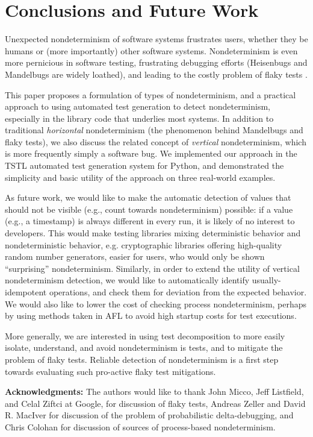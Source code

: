 \section{Conclusions and Future Work}

Unexpected nondeterminism of software systems frustrates users,
whether they be humans or (more importantly) other software systems.
Nondeterminism is even more pernicious in software testing,
frustrating debugging efforts (Heisenbugs \cite{Heisenbug} and
Mandelbugs \cite{GrottkeBugs,FaultTriggers} are widely loathed), and
leading to the costly problem of flaky tests
\cite{miccoflaky,listfieldtestanalysis}.

This paper proposes a formulation of types of nondeterminism, and a
practical approach to using automated test generation to detect
nondeterminism, especially in the library code that underlies most
systems. In addition to traditional \emph{horizontal} nondeterminism
(the phenomenon behind Mandelbugs and flaky tests), we also discuss
the related concept of \emph{vertical} nondeterminism, which is more
frequently simply a software bug.  We implemented our approach in the
TSTL automated test generation system for Python, and demonstrated the
simplicity and basic utility of the approach on three real-world examples.

As future work, we would like to make the automatic detection of
values that should not be visible (e.g., count towards nondeterminism)
possible: if a value (e.g., a timestamp) is always different in every
run, it is likely of no interest to developers.  This would make
testing libraries mixing deterministic behavior and nondeterministic
behavior, e.g. cryptographic libraries offering high-quality random
number generators, easier for users, who would only be shown
``surprising'' nondeterminism.  Similarly, in order to extend the
utility of vertical nondeterminism detection, we would like to
automatically identify usually-idempotent operations, and check them
for deviation from the expected behavior.  We would also like to lower the cost
of checking process nondeterminism, perhaps by using methods taken in
AFL \cite{aflfuzz} to avoid high startup costs for test executions.

More generally, we are interested in using test decomposition
\cite{Composition} to more easily isolate, understand, and avoid
nondeterminism is tests, and to mitigate the problem of flaky tests.
Reliable detection of nondeterminism is a first step towards
evaluating such pro-active flaky test mitigations.

{\scriptsize {\bf Acknowledgments:}  The authors would like to thank John Micco,
Jeff Listfield, and Celal Ziftci at Google, for discussion of
flaky tests, Andreas Zeller and David R. MacIver for discussion of the
problem of probabilistic delta-debugging, and Chris
Colohan for discussion of sources of process-based nondeterminism.}